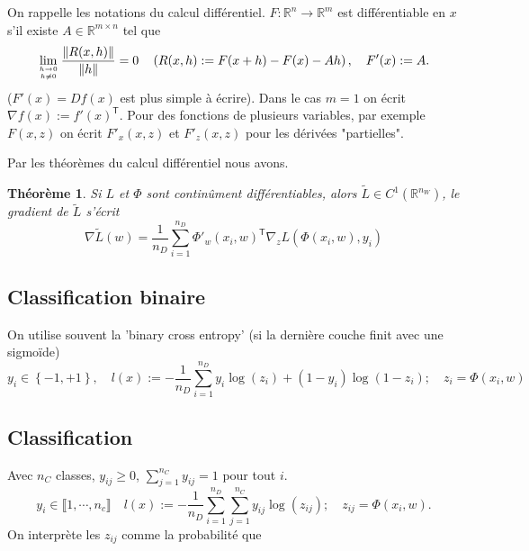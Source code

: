 \documentclass[11pt,a4paper]{article}
\newcommand{\nparammodel}{n_W}
\newcommand{\ndata}{n_D}
\newcommand{\R}{\mathbb R}
\newcommand{\norm}[1]{\|#1\|}
\newcommand{\Set}[1]{\left\{#1\right\}}
\newcommand{\transpose}[1]{{#1}^{\mathsf{T}}}
\newtheorem{theorem}{Théorème}[section]
\begin{document}
%
On rappelle les notations du calcul différentiel. $F:\R^n\to\R^m$ est différentiable en $x$ s'il existe $A\in\R^{m\times n}$ tel que 
\begin{align*}
\lim_{h\to 0\atop h\ne0}\frac{\norm{R(x,h)}}{\norm{h}} = 0\quad \left(R(x,h) := F(x+h)-F(x) - Ah\right),\quad F'(x) := A.
\end{align*}
($F'(x)= Df(x)$ est plus simple à écrire).
Dans le cas $m=1$ on écrit $\nabla f(x) := \transpose{f'(x)}$. Pour des fonctions de plusieurs variables, par exemple $F(x,z)$ on écrit 
$F'_x(x,z)$ et $F'_z(x,z)$ pour les dérivées  "partielles".

Par les théorèmes du calcul différentiel nous avons.
%
\begin{theorem}\label{theorem:}
Si $L$ et $\Phi$ sont continûment différentiables, alors   $\widetilde{L}\in C^1(\R^{\nparammodel})$, le gradient de $\widetilde{L}$ s'écrit
%
\begin{equation}\label{equation:}
\nabla  \widetilde{L}(w) = \frac{1}{\ndata}\sum_{i=1}^{\ndata} \transpose{\Phi'_w(x_i,w)}\nabla_z L(\Phi(x_i,w),y_i)
\end{equation}
%
\end{theorem}
%
%
\subsection{Classification binaire}\label{subsec:}
%
On utilise souvent la 'binary cross entropy' (si la dernière couche finit avec une sigmoïde)
%
\begin{equation}\label{equation:}
y_i \in \Set{-1,+1},\quad l(x) := -\frac{1}{\ndata}\sum_{i=1}^{\ndata} y_i\log(z_i)+(1-y_i)\log(1-z_i);\quad z_i = \Phi(x_i,w)
\end{equation}
%
%
\subsection{Classification}\label{subsec:}
%
Avec $n_C$ classes, $y_{ij}\ge0 $, $\sum_{j=1}^{n_C}y_{ij}=1$ pour tout $i$. 
%
\begin{equation}\label{equation:}
y_i \in \llbracket 1,\cdots, n_c\rrbracket \quad l(x) := -\frac{1}{\ndata}\sum_{i=1}^{\ndata}\sum_{j=1}^{n_C} y_{ij}\log(z_{ij});\quad z_{ij} = \Phi(x_i,w).
\end{equation}
%
On interprète les $z_{ij}$ comme la probabilité que 
%
\end{document}
